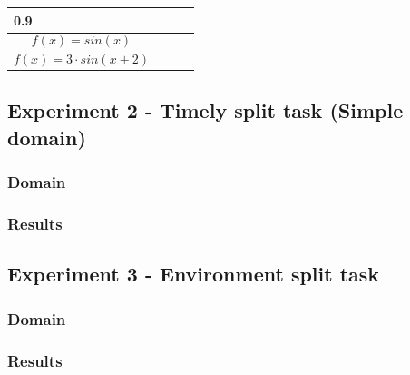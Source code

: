 \documentclass[11pt, a4paper]{article}
\begin{document}
\begin{center}
\begin{tabular}{ | p{4cm} | l | l | l |}
0.9
\\
    \hline
   \begin{equation} f(x) = sin(x) \nonumber \end{equation}  &
    &  &  \\
   \hline
   \begin{equation} f(x) = 3 \cdot sin(x+2) \nonumber \end{equation}  & & &  \\
   \hline
    \end{tabular}
\end{center}
\subsection{Experiment 2 - Timely split task (Simple domain)}
\subsubsection{Domain}
\subsubsection{Results}
\subsection{Experiment 3 - Environment split task}
\subsubsection{Domain}
\subsubsection{Results}
\end{document}
